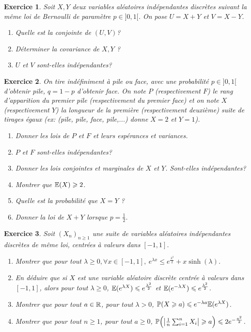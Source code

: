 \documentclass[12pt]{article}
\newtheorem{exercise}{Exercice}[section]
\theoremstyle{remark}
\theoremstyle{remark}
\renewcommand{\P}{\mathbb{P}} \newcommand{\im}{\emph{Im}}
\begin{document}
\begin{exercise}
	Soit $X,Y$ deux variables aléatoires indépendantes discrètes suivant la même
	loi de Bernoulli de paramètre $p\in]0,1[$. On pose $U=X+Y$ et $V=X-Y$.
	\begin{enumerate}
		\item
		Quelle est la conjointe de $(U,V)$?
		\item
		Déterminer la covariance de $X,Y$ ?
		\item
		$U$ et $V$ sont-elles indépendantes?
	\end{enumerate}
\end{exercise}

\begin{exercise}
	On tire indéfiniment à pile ou face, avec une probabilité $p\in]0,1[$
	d'obtenir pile, $q=1-p$ d'obtenir face. On note $P$ (respectivement $F$) le
	rang d'apparition du premier pile (respectivement du premier face) et on note
	$X$ (respectivement $Y$) la longueur de la première (respectivement deuxième)
	suite de tirages égaux (ex: (pile, pile, face, pile,...) donne $X=2$ et
	$Y=1$).
	\begin{enumerate}
		\item
		Donner les lois de $P$ et $F$ et leurs espérances et variances.
		\item
		$P$ et $F$ sont-elles indépendantes?
		\item
		Donner les lois conjointes et marginales de $X$ et $Y$. Sont-elles
		indépendantes?
		\item
		Montrer que $\mathbb{E}(X)\geqslant2$.
		\item
		Quelle est la probabilité que $X=Y$ ?
		\item
		Donner la loi de $X+Y$ lorsque $p=\frac{1}{2}$.
	\end{enumerate}
\end{exercise}

\begin{exercise}
	Soit $(X_{n})_{n\geqslant1}$ une suite de variables aléatoires indépendantes
	discrètes de même loi, centrées à valeurs dans $[-1,1]$.
	\begin{enumerate}
		\item
		Montrer que pour tout $\lambda\geqslant0,\forall x\in[-1,1],~e^{\lambda
		x}\leqslant e^{\frac{\lambda^{2}}{2}}+x\sinh(\lambda)$.
		\item
		En déduire que si $X$ est une variable aléatoire discrète centrée à
		valeurs dans $[-1,1]$, alors pour tout $\lambda\geqslant0$, $\mathbb{E}(e^{\lambda
		X})\leqslant e^{\frac{\lambda^{2}}{2}}$ et $\mathbb{E}(e^{-\lambda X})\leqslant
		e^{\frac{\lambda^{2}}{2}}$.
		\item
		Montrer que pour tout $a\in\mathbb{R}$, pour tout $\lambda>0$, $\P(X\geqslant
		a)\leqslant e^{-\lambda a}\E(e^{\lambda X})$.
		\item
		Montrer que pour tout $n\geqslant1$, pour tout $a\geqslant0$,
		$\P\Bigl(\bigl\vert\frac{1}{n}\sum_{i=1}^{n}X_{i}\bigr\vert\geqslant
		a\Bigr)\leqslant2e^{-\frac{a^{2}}{2}}$.
	\end{enumerate}
\end{exercise}
\end{document}
